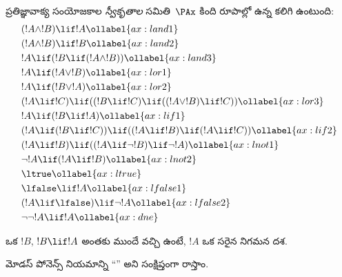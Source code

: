 \documentclass[../../../include/open-logic-section]{subfiles}
\begin{document}
      {}
      {}


\begin{defn}[స్వీకృతాలు]
ప్రతిజ్ఞావాక్య సంయోజకాల \emph{స్వీకృతాల} సమితి~$\PAx$ కింది
రూపాల్లో ఉన్న  కలిగి ఉంటుంది:
\begin{align}
  & (!A \land !B) \lif !A \ollabel{ax:land1}\\
  & (!A \land !B) \lif !B \ollabel{ax:land2}\\
  & !A \lif (!B \lif (!A \land !B)) \ollabel{ax:land3}\\
  & !A \lif (!A \lor !B) \ollabel{ax:lor1}\\
  & !A \lif (!B \lor !A) \ollabel{ax:lor2}\\
  & (!A \lif !C) \lif ((!B \lif !C) \lif ((!A \lor !B) \lif !C)) \ollabel{ax:lor3}\\
  & !A \lif (!B \lif !A) \ollabel{ax:lif1}\\
  & (!A \lif (!B \lif !C)) \lif ((!A \lif !B) \lif (!A \lif !C)) \ollabel{ax:lif2}\\
  & (!A \lif !B) \lif ((!A \lif \lnot !B) \lif \lnot !A) \ollabel{ax:lnot1}\\
  & \lnot !A \lif (!A \lif !B) \ollabel{ax:lnot2}\\
  & \ltrue \ollabel{ax:ltrue}\\
  & \lfalse \lif !A \ollabel{ax:lfalse1}\\
  & (!A \lif \lfalse) \lif \lnot !A \ollabel{ax:lfalse2}\\
  & \lnot\lnot !A \lif !A \ollabel{ax:dne}
\end{align}
\end{defn}

\begin{defn}[మోడస్ పోనెన్స్]
  ఒక  $!B$, $!B \lif !A$ అంతకు ముందే వచ్చి ఉంటే,
  $!A$ ఒక సరైన నిగమన దశ.
\end{defn}

మోడస్ పోనెన్స్ నియమాన్ని ``\MP'' అని సంక్షిప్తంగా రాస్తాం.
\end{document}
